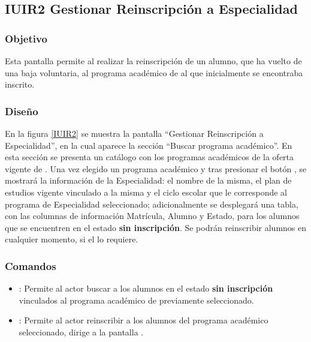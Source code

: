 \subsection{IUIR2 Gestionar Reinscripción a Especialidad}

\subsubsection{Objetivo}
	
Esta pantalla permite al  realizar la reinscripción de un alumno, que ha vuelto de una baja voluntaria, al programa académico de  al que inicialmente se encontraba inscrito.

\subsubsection{Diseño}
	

    En la figura \ref{IUIR2} se muestra la pantalla ``Gestionar Reinscripción a Especialidad'', en la cual aparece la sección ``Buscar programa académico''. En esta sección se presenta un catálogo con los programas académicos de la oferta vigente de . Una vez elegido un programa académico y tras presionar el botón , se mostrará la información de la Especialidad: el nombre de la misma, el plan de estudios vigente vinculado a la misma y el ciclo escolar que le corresponde al programa de Especialidad seleccionado; adicionalmente se desplegará una tabla, con las columnas de información Matrícula, Alumno y Estado, para los alumnos que se encuentren en el estado \textbf{sin inscripción}. Se podrán reinscribir alumnos en cualquier momento, si el  lo requiere.\\
    

\subsubsection{Comandos}
	\begin{itemize}
		\item {}: Permite al actor buscar a los alumnos en el estado \textbf{sin inscripción} vinculados al programa académico de  previamente seleccionado.
		\item {}: Permite al actor reinscribir a los alumnos del programa académico seleccionado, dirige a la pantalla .
	\end{itemize}
